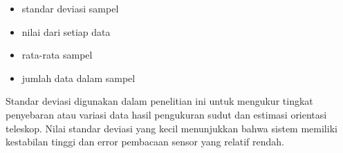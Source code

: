 \begin{itemize}
	\item[$s =$] standar deviasi sampel
	\item[$x =$] nilai dari setiap data
	\item[$\bar{x} =$] rata-rata sampel
	\item[$n =$] jumlah data dalam sampel
\end{itemize}
Standar deviasi digunakan dalam penelitian ini untuk mengukur tingkat penyebaran atau variasi data hasil pengukuran sudut dan estimasi orientasi teleskop. Nilai standar deviasi yang kecil menunjukkan bahwa sistem memiliki kestabilan tinggi dan error pembacaan sensor yang relatif rendah. \par

